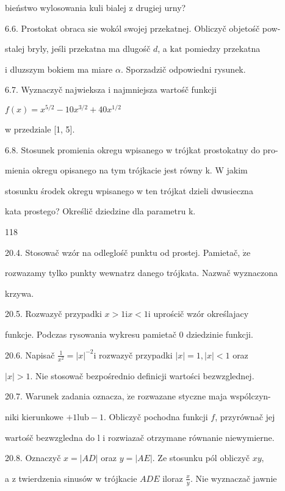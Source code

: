 \documentclass[a4paper,12pt]{article}
\begin{document}
bieństwo wylosowania kuli bialej $\mathrm{z}$ drugiej urny?

6.6. Prostokat obraca $\mathrm{s}\mathrm{i}\mathrm{e}$ wokól swojej przekatnej. Obliczyč objetośč pow-

stalej bryly, jeśli przekatna ma dlugośč $d$, a $\mathrm{k}\mathrm{a}\mathrm{t}$ pomiedzy przekatna

$\mathrm{i}$ dluzszym bokiem ma miare $\alpha$. Sporzadzič odpowiedni rysunek.

6.7. Wyznaczyč najwieksza $\mathrm{i}$ najmniejsza wartośč funkcji

$f(x)=x^{5/2}-10x^{3/2}+40x^{1/2}$

w przedziale [1, 5].

6.8. Stosunek promienia okregu wpisanego w trójkat prostokatny do pro-

mienia okregu opisanego na tym trójkacie jest równy k. W jakim

stosunku środek okregu wpisanego w ten trójkat dzieli dwusieczna

kata prostego? Określič dziedzine dla parametru k.





118

20.4. Stosowač wzór na odleglośč punktu od prostej. Pamietač, $\dot{\mathrm{z}}\mathrm{e}$

rozwazamy tylko punkty wewnatrz danego trójkata. Nazwač wyznaczona

krzywa.

20.5. Rozwazyč przypadki $x > 1 \mathrm{i}x < 1 \mathrm{i}$ uprościč wzór określajacy

funkcje. Podczas rysowania wykresu pamietač $0$ dziedzinie funkcji.

20.6. Napisač $\displaystyle \frac{1}{x^{2}} = |x|^{-2}\mathrm{i}$ rozwazyč przypadki $|x| =1, |x| < 1$ oraz

$|x|>1$. Nie stosowač bezpośrednio definicji wartości bezwzglednej.

20.7. Warunek zadania oznacza, $\dot{\mathrm{z}}\mathrm{e}$ rozwazane styczne maja wspólczyn-

niki kierunkowe $+1\mathrm{l}\mathrm{u}\mathrm{b}-1$. Obliczyč pochodna funkcji $f$, przyrównač jej

wartośč bezwzgledna do l $\mathrm{i}$ rozwiazač otrzymane równanie niewymierne.

20.8. Oznaczyč $x=|AD|$ oraz $y=|AE|$. Ze stosunku pól obliczyč $xy,$

a $\mathrm{z}$ twierdzenia sinusów $\mathrm{w}$ trójkacie $ADE$ iloraz $\displaystyle \frac{x}{y}$. Nie wyznaczač jawnie
\end{document}
